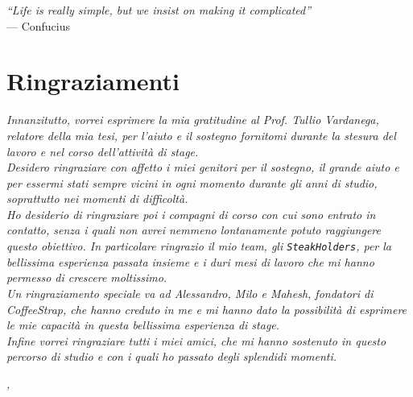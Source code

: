 
\cleardoublepage
{}
{}

\begin{flushright}{
	\slshape    
	``Life is really simple, but we insist on making it complicated''} \\ 
	\medskip
    --- Confucius
\end{flushright}


\bigskip

\begingroup
\let\clearpage\relax
\let\cleardoublepage\relax
\let\cleardoublepage\relax

\chapter*{Ringraziamenti}

\noindent \textit{Innanzitutto, vorrei esprimere la mia gratitudine al Prof. Tullio Vardanega, relatore della mia tesi, per l'aiuto e il sostegno fornitomi durante la stesura del lavoro e nel corso dell'attività di stage.}\\

\noindent \textit{Desidero ringraziare con affetto i miei genitori per il sostegno, il grande aiuto e per essermi stati sempre vicini in ogni momento durante gli anni di studio, soprattutto nei momenti di difficoltà.}\\

\noindent \textit{Ho desiderio di ringraziare poi i compagni di corso con cui sono entrato in contatto, senza i quali non avrei nemmeno lontanamente potuto raggiungere questo obiettivo. In particolare ringrazio il mio team, gli \texttt{SteakHolders}, per la bellissima esperienza passata insieme e i duri mesi di lavoro che mi hanno permesso di crescere moltissimo.}\\

\noindent \textit{Un ringraziamento speciale va ad Alessandro, Milo e Mahesh, fondatori di CoffeeStrap, che hanno creduto in me e mi hanno dato la possibilità di esprimere le mie capacità in questa bellissima esperienza di stage.}\\

\noindent \textit{Infine vorrei ringraziare tutti i miei amici, che mi hanno sostenuto in questo percorso di studio e con i quali ho passato degli splendidi momenti.}\\

\bigskip

\noindent\textit{\myLocation, \myTime}
\hfill \myName

\endgroup


